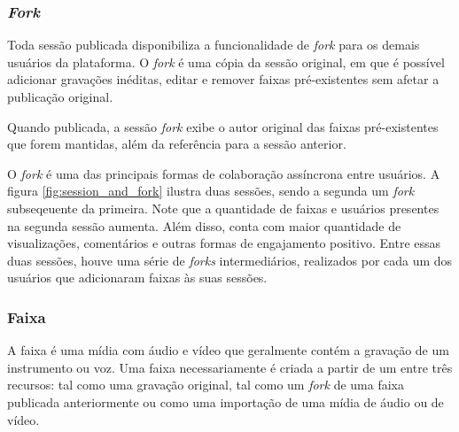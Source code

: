 \subsubsection{\textit{Fork}}
Toda sessão publicada disponibiliza a funcionalidade de \textit{fork} para os
demais usuários da plataforma. O \textit{fork} é uma cópia da sessão original,
em que é possível adicionar gravações inéditas, editar e remover faixas pré-existentes sem afetar a publicação original.

Quando publicada, a sessão \textit{fork} exibe o autor original das faixas
pré-existentes que forem mantidas, além da referência para a sessão anterior.

O \textit{fork} é uma das principais formas de colaboração assíncrona entre
usuários. A figura \ref{fig:session_and_fork} ilustra duas sessões, sendo a
segunda um \textit{fork} subseqeuente da primeira. Note que a quantidade de
faixas e usuários presentes na segunda sessão aumenta. Além disso, conta com
maior quantidade de visualizações, comentários e outras formas de engajamento
positivo. Entre essas duas sessões, houve uma série de \textit{forks}
intermediários, realizados por cada um dos usuários que adicionaram faixas às
suas sessões.


\subsubsection{Faixa}
A faixa é uma mídia com áudio e vídeo que geralmente contém a gravação de um
instrumento ou voz. Uma faixa necessariamente é criada a partir de um entre três
recursos: tal como uma gravação original, tal como um \textit{fork} de uma faixa
publicada anteriormente ou como uma importação de uma mídia de áudio ou de
vídeo.





